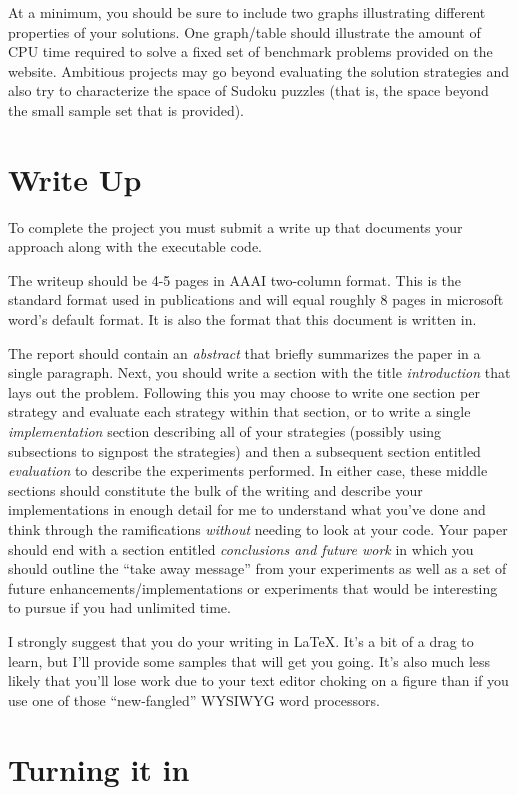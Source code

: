 \documentclass[letterpaper]{article}
\begin{document}
 At a minimum, you should be sure to include two graphs illustrating
 different properties of your solutions. One graph/table should
illustrate the amount of CPU time required to solve a fixed set of
benchmark problems provided on the website.  Ambitious projects may
go beyond evaluating the solution strategies and also try to
characterize the space of Sudoku puzzles (that is, the space beyond the small sample
set that is provided).

\section{Write Up}

To complete the project you must submit a write up that documents your
approach along with the executable code.

The writeup should be 4-5 pages in AAAI two-column format.  This is
the standard format used in publications and will equal roughly 8
pages in microsoft word's default format.  It is also the format that
this document is written in.

The report should contain
an {\em abstract} that briefly summarizes the paper in a single
paragraph. Next, you should write a section with the title {\em
  introduction} that lays out the problem. Following this you may
choose to write one section per strategy and evaluate each strategy
within that section, or to write a single {\em implementation} section
describing all of your strategies (possibly using subsections to
signpost the strategies) and then a subsequent section entitled {\em
  evaluation} to describe the experiments performed.  In either case,
these middle sections should constitute the bulk of the writing and
describe your implementations in enough detail for me to understand
what you've done and think through the ramifications {\em without}
needing to look at your code.  Your paper should end with a section
entitled {\em conclusions and future work} in which you should outline
the ``take away message'' from your experiments as well as a set of
future enhancements/implementations or experiments that would be
interesting to pursue if you had unlimited time.

I strongly suggest that you do your writing in LaTeX.  It's a bit of a
drag to learn, but I'll provide some samples that will get you going.
It's also much less likely that you'll lose work due to your text
editor choking on a figure than if you use one of those ``new-fangled''
WYSIWYG word processors.

\section{Turning it in}
\end{document}
